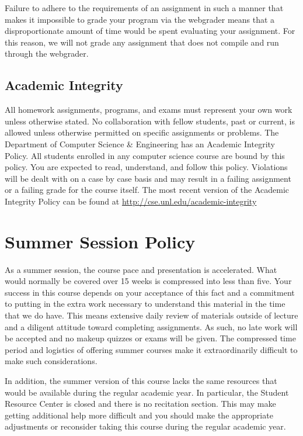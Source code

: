 \documentclass[12pt]{scrartcl}
\begin{document}
Failure to adhere to the requirements of an assignment in such 
a manner that makes it impossible to grade your program via 
the webgrader means that a disproportionate amount of time 
would be spent evaluating your assignment.  For this reason, 
we will not grade any assignment that does not compile and 
run through the webgrader.  

\subsection{Academic Integrity}

All homework assignments, programs, and exams must represent
your own work unless otherwise stated.  No collaboration with 
fellow students, past or current, is allowed unless otherwise 
permitted on specific assignments or problems.  The Department of
Computer Science \& Engineering has an Academic Integrity Policy.  
All students enrolled in any computer science course are bound 
by this policy.  You are expected to read, understand, and follow 
this policy.  Violations will be dealt with on a case by case 
basis and may result in a failing assignment or a failing grade 
for the course itself.  The most recent version of the Academic 
Integrity Policy can be found at \url{http://cse.unl.edu/academic-integrity}

\section{Summer Session Policy}

As a summer session, the course pace and presentation is 
accelerated.  What would normally be covered over 15 weeks 
is compressed into less than five.  Your success in this 
course depends on your acceptance of this fact and a 
commitment to putting in the extra work necessary to 
understand this material in the time that we do have.  
This means extensive daily review of materials outside 
of lecture and a diligent attitude toward completing 
assignments.  As such, no late work will be accepted and 
no makeup quizzes or exams will be given.  The compressed 
time period and logistics of offering summer courses make 
it extraordinarily difficult to make such considerations.

In addition, the summer version of this course lacks the 
same resources that would be available during the regular 
academic year.  In particular, the Student Resource Center 
is closed and there is no recitation section.  This may 
make getting additional help more difficult and you should 
make the appropriate adjustments or reconsider taking this 
course during the regular academic year. 
\end{document}
